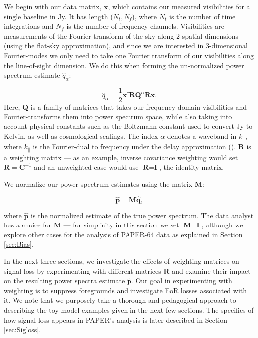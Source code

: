 \documentclass[preprint2,numberedappendix,tighten]{aastex6}  %
\begin{document}
We begin with our data matrix, $\textbf{x}$, which contains our measured visibilities for a single baseline in Jy. It has length ($N_{t}, N_{f}$), where 
$N_{t}$ is the number of time integrations and $N_{f}$ is the number of frequency channels. Visibilities are measurements of 
the Fourier transform of the sky along $2$ spatial dimensions (using the flat-sky approximation), and since we are interested in $3$-dimensional Fourier-modes 
we only need to take one Fourier transform of our visibilities along the line-of-sight dimension. We do this when forming the un-normalized power spectrum estimate $\hat{q}_{\alpha}$:

\begin{equation}
\label{eq:qhat}
\hat{q}_{\alpha} = \frac{1}{2}\textbf{x}^{\dagger}\textbf{R}\textbf{Q}^{\alpha}\textbf{R}\textbf{x}.
\end{equation}
Here, \noindent $\textbf{Q}$ is a family of matrices that takes our frequency-domain visibilities and Fourier-transforms them into 
power spectrum space, while also taking into account physical constants such as the Boltzmann constant used to convert Jy to 
Kelvin, as well as cosmological scalings. The index $\alpha$ denotes a waveband in $k_{\parallel}$, where $k_{\parallel}$ is the 
Fourier-dual to frequency under the delay approximation (\citealt{parsons_et_al2012b}). $\textbf{R}$ is a weighting matrix --- as 
an example, inverse covariance weighting would set $\textbf{R} = \textbf{C}^{-1}$ and an unweighted case would use $
\textbf{R} = \textbf{I}$, the identity matrix.

We normalize our power spectrum estimates using the matrix $\textbf{M}$:

\begin{equation}
\label{eq:phat}
\hat{\textbf{p}} = \textbf{M}\hat{\textbf{q}},
\end{equation}

\noindent where $\hat{\textbf{p}}$ is the normalized estimate of the true power spectrum. The data analyst has a choice for $
\textbf{M}$ --- for simplicity in this section we set $\textbf{M} = \textbf{I}$, although we explore other cases for the analysis 
of PAPER-64 data as explained in Section \ref{sec:Bias}.

In the next three sections, we investigate the effects of weighting matrices on signal loss by experimenting with different 
matrices $\textbf{R}$ and examine their impact on the resulting power spectra estimate $\hat{\textbf{p}}$. Our goal in 
experimenting with weighting is to suppress foregrounds and investigate EoR losses associated with it. We note that we 
purposely take a thorough and pedagogical approach to describing the toy model examples given in the next few sections. The specifics of how signal loss appears in PAPER's analysis is later described in Section 
\ref{sec:Sigloss}.
\end{document}

